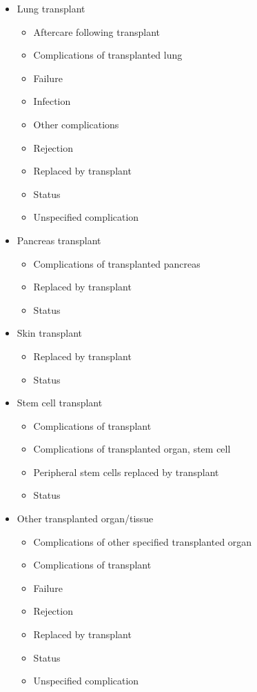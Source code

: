 \begin{itemize}
\begin{itemize}
        \item Lung transplant
        \begin{itemize}
            \item Aftercare following transplant
            \item Complications of transplanted lung
            \item Failure
            \item Infection
            \item Other complications
            \item Rejection
            \item Replaced by transplant
            \item Status
            \item Unspecified complication
        \end{itemize}
        
        \item Pancreas transplant
        \begin{itemize}
            \item Complications of transplanted pancreas
            \item Replaced by transplant
            \item Status
        \end{itemize}
        
        \item Skin transplant
        \begin{itemize}
            \item Replaced by transplant
            \item Status
        \end{itemize}
        
        \item Stem cell transplant
        \begin{itemize}
            \item Complications of transplant
            \item Complications of transplanted organ, stem cell
            \item Peripheral stem cells replaced by transplant
            \item Status
        \end{itemize}
        
        \item Other transplanted organ/tissue
        \begin{itemize}
            \item Complications of other specified transplanted organ
            \item Complications of transplant
            \item Failure
            \item Rejection
            \item Replaced by transplant
            \item Status
            \item Unspecified complication
        \end{itemize}
        

\end{itemize}
\end{itemize}
